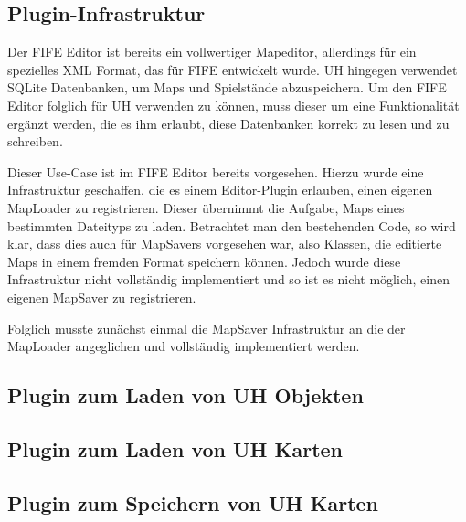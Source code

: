 \subsection{Plugin-Infrastruktur}
Der FIFE Editor ist bereits ein vollwertiger Mapeditor, allerdings für ein spezielles XML Format,
das für FIFE entwickelt wurde. UH hingegen verwendet SQLite Datenbanken, um Maps und Spielstände
abzuspeichern. Um den FIFE Editor folglich für UH verwenden zu können, muss dieser um eine
Funktionalität ergänzt werden, die es ihm erlaubt, diese Datenbanken korrekt zu lesen und zu schreiben.

Dieser Use-Case ist im FIFE Editor bereits vorgesehen. Hierzu wurde eine Infrastruktur geschaffen, die
es einem Editor-Plugin erlauben, einen eigenen MapLoader zu registrieren. Dieser übernimmt die
Aufgabe, Maps eines bestimmten Dateityps zu laden. Betrachtet man den bestehenden Code, so wird klar,
dass dies auch für MapSavers vorgesehen war, also Klassen, die editierte Maps in einem fremden Format
speichern können. Jedoch wurde diese Infrastruktur nicht vollständig implementiert und so ist es
nicht möglich, einen eigenen MapSaver zu registrieren.

Folglich musste zunächst einmal die MapSaver Infrastruktur an die der MapLoader angeglichen und vollständig
implementiert werden.

\subsection{Plugin zum Laden von UH Objekten}
\subsection{Plugin zum Laden von UH Karten}
\subsection{Plugin zum Speichern von UH Karten}



